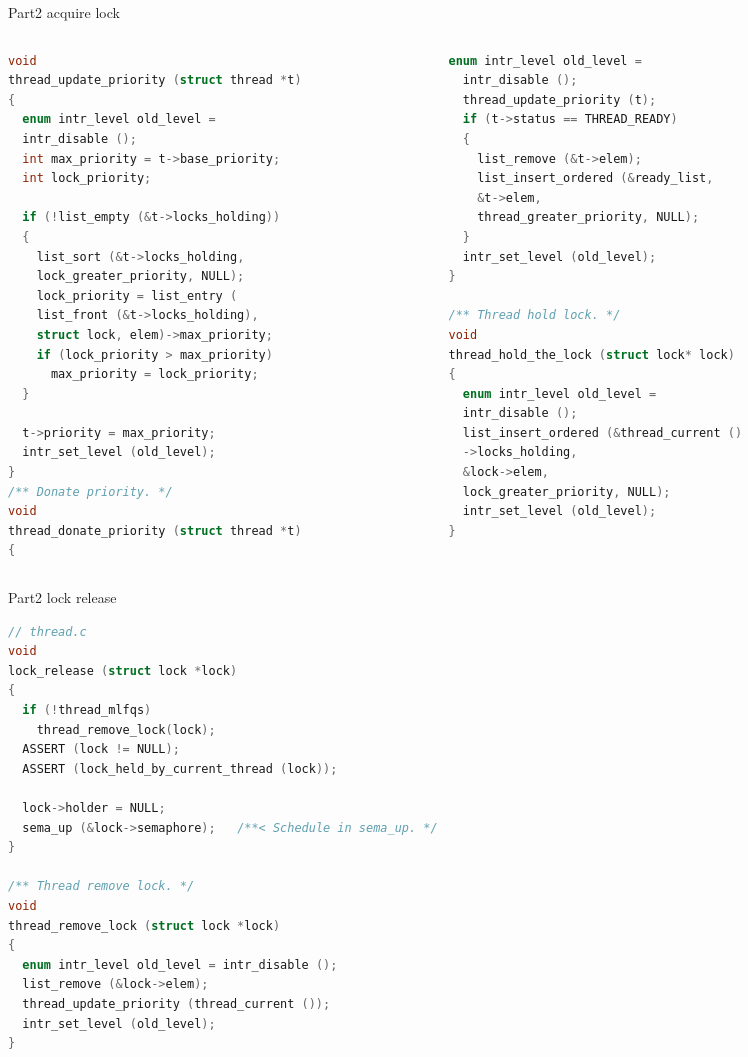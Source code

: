 \documentclass{beamer}
\begin{document}
\begin{frame}[fragile]{Part2 acquire lock}
\begin{columns}
\begin{column}{0.5\textwidth}
\begin{lstlisting}[language=C]
void
thread_update_priority (struct thread *t)
{
  enum intr_level old_level = 
  intr_disable ();
  int max_priority = t->base_priority;
  int lock_priority;

  if (!list_empty (&t->locks_holding))
  {
    list_sort (&t->locks_holding, 
    lock_greater_priority, NULL);
    lock_priority = list_entry (
    list_front (&t->locks_holding),
    struct lock, elem)->max_priority;
    if (lock_priority > max_priority)
      max_priority = lock_priority;
  }

  t->priority = max_priority;
  intr_set_level (old_level);
}
/** Donate priority. */
void
thread_donate_priority (struct thread *t)
{
\end{lstlisting}
\end{column}
\begin{column}{0.5\textwidth}
\begin{lstlisting}[language=C]
  enum intr_level old_level = 
  intr_disable ();
  thread_update_priority (t);
  if (t->status == THREAD_READY)
  {
    list_remove (&t->elem);
    list_insert_ordered (&ready_list,
    &t->elem,
    thread_greater_priority, NULL);
  }
  intr_set_level (old_level);
}

/** Thread hold lock. */
void 
thread_hold_the_lock (struct lock* lock)
{
  enum intr_level old_level = 
  intr_disable ();
  list_insert_ordered (&thread_current ()
  ->locks_holding, 
  &lock->elem, 
  lock_greater_priority, NULL);
  intr_set_level (old_level);
}
\end{lstlisting}
\end{column}
\end{columns}
\end{frame}
\begin{frame}[fragile]{Part2 lock release}
\begin{lstlisting}[language=C]
// thread.c
void
lock_release (struct lock *lock) 
{
  if (!thread_mlfqs)
    thread_remove_lock(lock);
  ASSERT (lock != NULL);
  ASSERT (lock_held_by_current_thread (lock));

  lock->holder = NULL;
  sema_up (&lock->semaphore);   /**< Schedule in sema_up. */
}

/** Thread remove lock. */
void
thread_remove_lock (struct lock *lock)
{
  enum intr_level old_level = intr_disable ();
  list_remove (&lock->elem);
  thread_update_priority (thread_current ());
  intr_set_level (old_level);
}
\end{lstlisting}
\end{frame}
\end{document}
